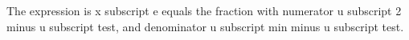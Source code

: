 The expression is x subscript e equals the fraction with numerator u subscript 2 minus u subscript test, and denominator u subscript min minus u subscript test.
